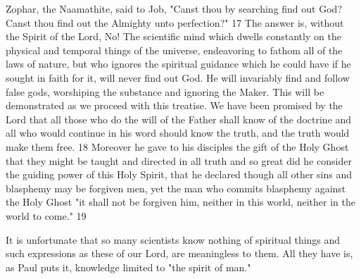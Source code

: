 Zophar, the Naamathite, said to Job, "Canst thou by searching find out God? Canst thou find
out the Almighty unto perfection?" 17 The answer is, without the Spirit of the Lord, No! The
scientific mind which dwells constantly on the physical and temporal things of the universe,
endeavoring to fathom all of the laws of nature, but who ignores the spiritual guidance which
he could have if he sought in faith for it, will never find out God. He will invariably find and
follow false gods, worshiping the substance and ignoring the Maker. This will be
demonstrated as we proceed with this treatise. We have been promised by the Lord that all
those who do the will of the Father shall know of the doctrine and all who would continue in
his word should know the truth, and the truth would make them free. 18 Moreover he gave to
his disciples the gift of the Holy Ghost that they might be taught and directed in all truth and
so great did he consider the guiding power of this Holy Spirit, that he declared though all
other sins and blasphemy may be forgiven men, yet the man who commits blasphemy against
the Holy Ghost "it shall not be forgiven him, neither in this world, neither in the world to
come." 19

It is unfortunate that so many scientists know nothing of spiritual things and such expressions
as these of our Lord, are meaningless to them. All they have is, as Paul puts it, knowledge
limited to "the spirit of man."

